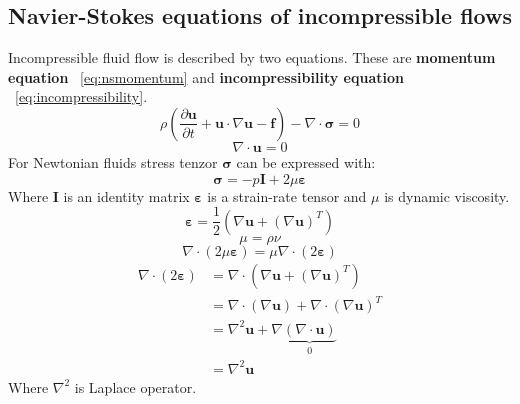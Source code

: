 \documentclass[a4paper,10pt]{book}
\begin{document}
\subsection{Navier-Stokes equations of incompressible flows}
    Incompressible fluid flow is described by two equations. These are \textbf{momentum equation} ~\ref{eq:nsmomentum} and \textbf{incompressibility equation} ~\ref{eq:incompressibility}.
    \begin{equation}
    \label{eq:nsmomentum}
    \rho\left(\frac{\partial\mathbf{u}}{\partial{t}}
    +\mathbf{u}\cdot\nabla\mathbf{u}-\mathbf{f}\right)
    -\nabla\cdot\boldsymbol{\sigma}=0
    \end{equation}
    \begin{equation}
    \label{eq:incompressibility}
    \nabla\cdot\mathbf{u}=0
    \end{equation}
    For Newtonian fluids stress tenzor $\boldsymbol\sigma$ can be expressed with:
    \begin{equation}
    \boldsymbol{\sigma}=-p\mathbf{I}+2\mu\boldsymbol{\varepsilon}
    \end{equation}
    Where $\mathbf{I}$ is an identity matrix $\boldsymbol\varepsilon$ is a strain-rate tensor and $\mu$ is dynamic viscosity.
    \begin{equation}
    \boldsymbol{\varepsilon}=\frac{1}{2}
    \left(
        \nabla\mathbf{u}+\left(\nabla\mathbf{u}\right)^T
    \right)
    \end{equation}
    \begin{equation}
    \mu=\rho\nu
    \end{equation}
    \begin{equation}
    \nabla\cdot\left(2\mu\boldsymbol{\varepsilon}\right)=
    \mu\nabla\cdot\left(2\boldsymbol{\varepsilon}\right)
    \end{equation}
    \begin{equation}
    \begin{split}
    \nabla\cdot\left(2\boldsymbol{\varepsilon}\right)
    &=\nabla\cdot\left(\nabla\mathbf{u}+\left(\nabla\mathbf{u}\right)^T\right) \\
    &=\nabla\cdot\left(\nabla\mathbf{u}\right)+\nabla\cdot\left(\nabla\mathbf{u}\right)^T \\
    &=\nabla^2\mathbf{u}+\nabla\underbrace{\left(\nabla\cdot\mathbf{u}\right)}_{0} \\
    &=\nabla^2\mathbf{u}
    \end{split}
    \end{equation}
    Where $\nabla^2$ is Laplace operator.
\end{document}
